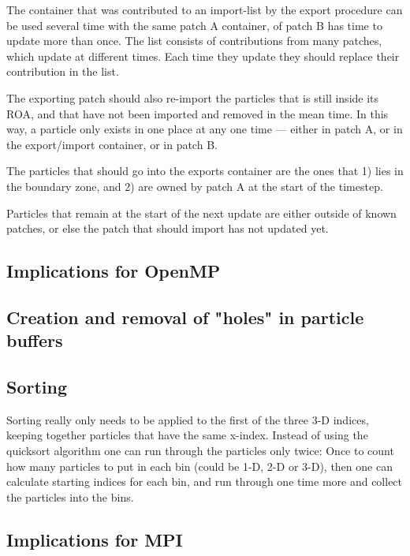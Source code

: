 \documentclass[paper=a4,fontsize=11pt]{scrartcl}
\numberwithin{equation}{section}		%
\numberwithin{figure}{section}			%
\numberwithin{table}{section}				%
\begin{document}
The container that was contributed to an import-list by the export procedure can be used several time with the same patch A container, of patch B has time to update more than once.  The list consists of contributions from many patches, which update at different times.  Each time they update they should replace their contribution in the list.

The exporting patch should also re-import the particles that is still inside its ROA, and that have not been imported and removed in the mean time.  In this way, a particle only exists in one place at any one time --- either in patch A, or in the export/import container, or in patch B.

The particles that should go into the exports container are the ones that 1) lies in the boundary zone, and 2) are owned by patch A at the start of the timestep.

Particles that remain at the start of the next update are either outside of known patches, or else the patch that should import has not updated yet.

\subsection{Implications for OpenMP}

\subsection{Creation and removal of "holes" in particle buffers}

\subsection{Sorting}
Sorting really only needs to be applied to the first of the three 3-D indices, keeping together particles that have the same x-index.  Instead of using the quicksort algorithm one can run through the particles only twice:  Once to count how many particles to put in each bin (could be 1-D, 2-D or 3-D), then one can calculate starting indices for each bin, and run through one time more and collect the particles into the bins.

\subsection{Implications for MPI}
\end{document}
